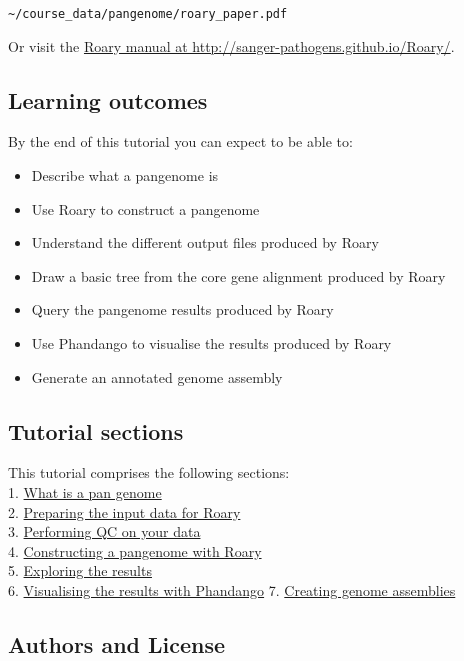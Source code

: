 \documentclass[11pt]{article}
\providecommand{\tightlist}{%
      \setlength{\itemsep}{0pt}\setlength{\parskip}{0pt}}
\begin{document}
\texttt{\textasciitilde{}/course\_data/pangenome/roary\_paper.pdf}

Or visit the \href{http://sanger-pathogens.github.io/Roary/}{Roary
manual at http://sanger-pathogens.github.io/Roary/}.

\hypertarget{learning-outcomes}{%
\subsection{Learning outcomes}\label{learning-outcomes}}

By the end of this tutorial you can expect to be able to:

\begin{itemize}
\tightlist
\item
  Describe what a pangenome is
\item
  Use Roary to construct a pangenome
\item
  Understand the different output files produced by Roary
\item
  Draw a basic tree from the core gene alignment produced by Roary
\item
  Query the pangenome results produced by Roary
\item
  Use Phandango to visualise the results produced by Roary
\item
  Generate an annotated genome assembly
\end{itemize}

\hypertarget{tutorial-sections}{%
\subsection{Tutorial sections}\label{tutorial-sections}}

This tutorial comprises the following sections:\\
1. \href{pan_genome.ipynb}{What is a pan genome}\\
2. \href{prepare_data.ipynb}{Preparing the input data for Roary}\\
3. \href{qc.ipynb}{Performing QC on your data}\\
4. \href{run_roary.ipynb}{Constructing a pangenome with Roary}\\
5. \href{results.ipynb}{Exploring the results}\\
6. \href{phandango.ipynb}{Visualising the results with Phandango} 7.
\href{assembly.ipynb}{Creating genome assemblies}

\hypertarget{authors-and-license}{%
\subsection{Authors and License}\label{authors-and-license}}
\end{document}
